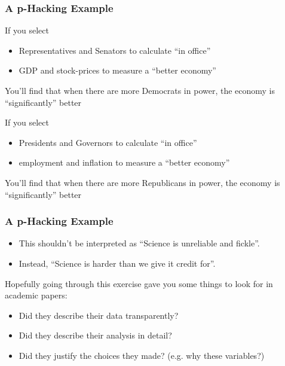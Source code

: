 \documentclass{beamer} %
\newcommand{\1}{\mathbb{1}}
\begin{document}
\begin{frame}[t]\frametitle{A p-Hacking Example}

If you select 
\begin{itemize}
	\item Representatives and Senators to calculate ``in office''
	\item GDP and stock-prices to measure a ``better economy''
\end{itemize}
\vspace{3mm}
You'll find that when there are more Democrats in power, the economy is ``significantly'' better
\vspace{3mm}

If you select 
\begin{itemize}
	\item Presidents and Governors to calculate ``in office''
	\item employment and inflation to measure a ``better economy''
\end{itemize}
\vspace{3mm}
You'll find that when there are more Republicans in power, the economy is ``significantly'' better

\end{frame}



\begin{frame}[t]\frametitle{A p-Hacking Example}

\vspace{5mm}
\begin{itemize}
	\item This shouldn't be interpreted as ``Science is unreliable and fickle''.
	\item Instead, ``Science is harder than we give it credit for''.
\end{itemize}
\vspace{5mm}

Hopefully going through this exercise gave you some things to look for in academic papers:
\begin{itemize}
	\item Did they describe their data transparently?
	\item Did they describe their analysis in detail?
	\item Did they justify the choices they made? (e.g. why these variables?)
\end{itemize}


\end{frame}
\end{document}
